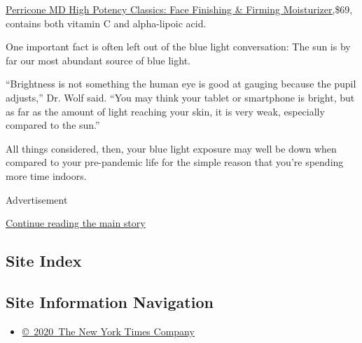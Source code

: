 \href{https://www.perriconemd.com/products/face-finishing-firming-moisturizer-51090023}{Perricone
MD High Potency Classics: Face Finishing \& Firming Moisturizer,}\$69,
contains both vitamin C and alpha-lipoic acid.

One important fact is often left out of the blue light conversation: The
sun is by far our most abundant source of blue light.

``Brightness is not something the human eye is good at gauging because
the pupil adjusts,'' Dr. Wolf said. ``You may think your tablet or
smartphone is bright, but as far as the amount of light reaching your
skin, it is very weak, especially compared to the sun.''

All things considered, then, your blue light exposure may well be down
when compared to your pre-pandemic life for the simple reason that
you're spending more time indoors.

Advertisement

\protect\hyperlink{after-bottom}{Continue reading the main story}

\hypertarget{site-index}{%
\subsection{Site Index}\label{site-index}}

\hypertarget{site-information-navigation}{%
\subsection{Site Information
Navigation}\label{site-information-navigation}}

\begin{itemize}
\tightlist
\item
  \href{https://help.nytimes3xbfgragh.onion/hc/en-us/articles/115014792127-Copyright-notice}{©~2020~The
  New York Times Company}
\end{itemize}

